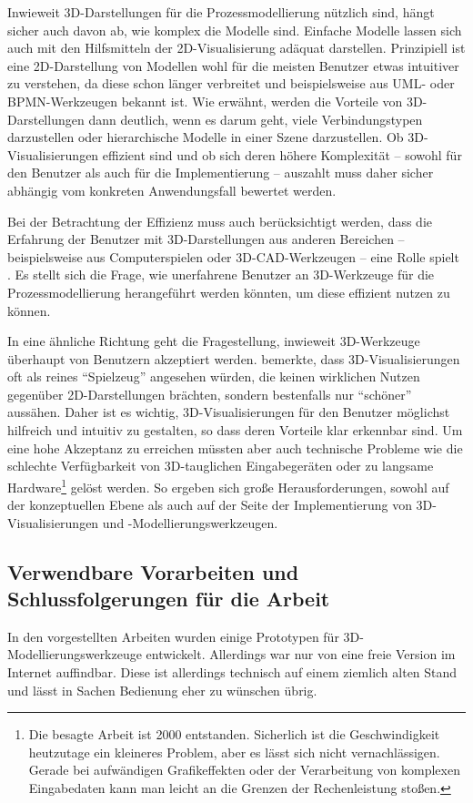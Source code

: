 \documentclass[a4paper,10pt]{sphinxmanual}
\begin{document}
Inwieweit 3D-Darstellungen für die Prozessmodellierung nützlich sind, hängt sicher auch davon ab, wie komplex die Modelle sind.
Einfache Modelle lassen sich auch mit den Hilfsmitteln der 2D-Visualisierung adäquat darstellen.
Prinzipiell ist eine 2D-Darstellung von Modellen wohl für die meisten Benutzer etwas intuitiver zu verstehen, da diese schon länger verbreitet und beispielsweise aus UML- oder BPMN-Werkzeugen bekannt ist.
Wie erwähnt, werden die Vorteile von 3D-Darstellungen dann deutlich, wenn es darum geht, viele Verbindungstypen darzustellen oder hierarchische Modelle in einer Szene darzustellen.
Ob 3D-Visualisierungen effizient sind und ob sich deren höhere Komplexität – sowohl für den Benutzer als auch für die Implementierung – auszahlt muss daher sicher abhängig vom konkreten Anwendungsfall bewertet werden.

Bei der Betrachtung der Effizienz muss auch berücksichtigt werden, dass die Erfahrung der Benutzer mit 3D-Darstellungen aus anderen Bereichen – beispielsweise aus Computerspielen oder 3D-CAD-Werkzeugen – eine Rolle spielt
\cite{dwyer_three_2001} \cite{ware_visualizing_2008} \cite{schonhage_3d_2000}.
Es stellt sich die Frage, wie unerfahrene Benutzer an 3D-Werkzeuge für die Prozessmodellierung herangeführt werden könnten, um diese effizient nutzen zu können.

In eine ähnliche Richtung geht die Fragestellung, inwieweit 3D-Werkzeuge überhaupt von Benutzern akzeptiert werden.
\cite{schonhage_3d_2000} bemerkte, dass 3D-Visualisierungen oft als reines "`Spielzeug"' angesehen würden, die keinen wirklichen Nutzen gegenüber 2D-Darstellungen brächten, sondern bestenfalls nur "`schöner"' aussähen.
Daher ist es wichtig, 3D-Visualisierungen für den Benutzer möglichst hilfreich und intuitiv zu gestalten, so dass deren Vorteile klar erkennbar sind.
Um eine hohe Akzeptanz zu erreichen müssten aber auch technische Probleme wie die schlechte Verfügbarkeit von 3D-tauglichen Eingabegeräten oder zu langsame Hardware\footnote{
Die besagte Arbeit ist 2000 entstanden. Sicherlich ist die Geschwindigkeit heutzutage ein kleineres Problem, aber es lässt sich nicht vernachlässigen. Gerade bei aufwändigen Grafikeffekten oder der Verarbeitung von komplexen Eingabedaten kann man leicht an die Grenzen der Rechenleistung stoßen.
} gelöst werden.
So ergeben sich große Herausforderungen, sowohl auf der konzeptuellen Ebene als auch auf der Seite der Implementierung von 3D-Visualisierungen und -Modellierungswerkzeugen.


\subsection{Verwendbare Vorarbeiten und Schlussfolgerungen für die Arbeit}
\label{related:verwendbare-vorarbeiten-und-schlussfolgerungen-fur-die-arbeit}
In den vorgestellten Arbeiten wurden einige Prototypen für 3D-Modellierungswerkzeuge entwickelt.
Allerdings war nur von \cite{dwyer_three_2001} eine freie Version im Internet auffindbar.
Diese ist allerdings technisch auf einem ziemlich alten Stand und lässt in Sachen Bedienung eher zu wünschen übrig.
\end{document}
